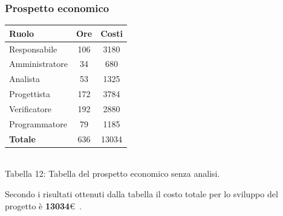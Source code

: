 \subsubsection{Prospetto economico}
\begin{center}
\begin{tabular}{| l | c | c |}
\hline
Ruolo & Ore & Costi \\
\hline
Responsabile & 106 & 3180 \\
Amministratore & 34 & 680 \\
Analista & 53 & 1325\\
Progettista & 172 & 3784 \\
Verificatore & 192 & 2880 \\
Programmatore & 79 & 1185 \\
\hline
\textbf{Totale} & 636 & 13034 \\
\hline
\end{tabular}
\\
Tabella 12: Tabella del prospetto economico senza analisi.
\end{center}
Secondo i risultati ottenuti dalla tabella il costo totale per lo sviluppo del progetto è \textbf{13034}\euro~.